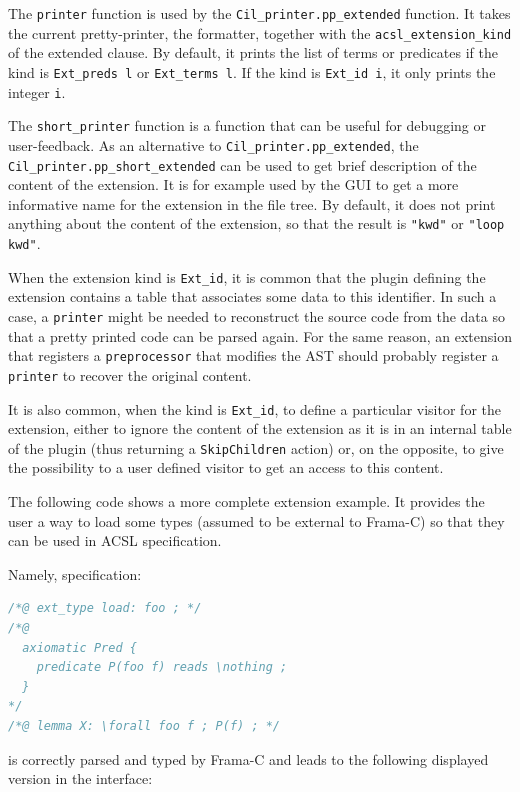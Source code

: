 The \verb|printer| function is used by the \verb|Cil_printer.pp_extended|
function. It takes the current pretty-printer, the formatter, together with
the \verb|acsl_extension_kind| of the extended clause. By default, it prints
the list of terms or predicates if the kind is \verb|Ext_preds l| or
\verb|Ext_terms l|. If the kind is \verb|Ext_id i|, it only prints the
integer \verb|i|.

The \verb|short_printer| function is a function that can be useful for
debugging or user-feedback. As an alternative to \verb|Cil_printer.pp_extended|,
the \verb|Cil_printer.pp_short_extended| can be used to get brief description
of the content of the extension. It is for example used by the GUI to get
a more informative name for the extension in the file tree. By default, it
does not print anything about the content of the extension, so that the
result is \verb|"kwd"| or \verb|"loop kwd"|.

When the extension kind is \verb|Ext_id|, it is common that the plugin
defining the extension contains a table that associates some data to this
identifier. In such a case, a \verb|printer| might be needed to reconstruct
the source code from the data so that a pretty printed code can be parsed
again. For the same reason, an extension that registers a \verb|preprocessor|
that modifies the AST should probably register a \verb|printer| to recover
the original content.

It is also common, when the kind is \verb|Ext_id|, to define a particular
visitor for the extension, either to ignore the content of the extension as
it is in an internal table of the plugin (thus returning a \verb|SkipChildren|
action) or, on the opposite, to give the possibility to a user defined visitor
to get an access to this content.

The following code shows a more complete extension example. It provides the
user a way to load some types (assumed to be external to Frama-C) so that they
can be used in ACSL specification.


Namely, specification:

\begin{lstlisting}[language=C,alsolanguage=ACSL]
/*@ ext_type load: foo ; */
/*@ 
  axiomatic Pred {
    predicate P(foo f) reads \nothing ;
  }
*/
/*@ lemma X: \forall foo f ; P(f) ; */
\end{lstlisting}

is correctly parsed and typed by Frama-C and leads to the following displayed
version in the interface:

